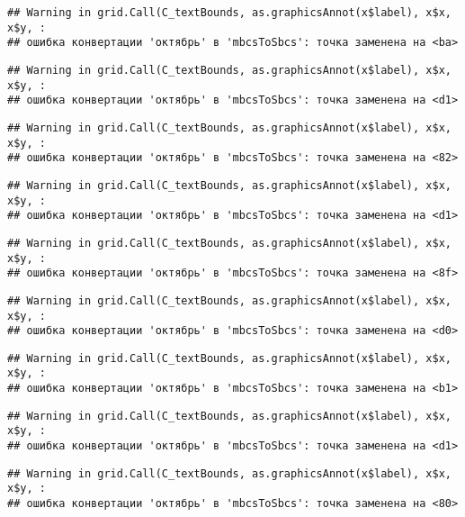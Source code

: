\documentclass[
]{article}
\begin{document}
\begin{verbatim}
## Warning in grid.Call(C_textBounds, as.graphicsAnnot(x$label), x$x, x$y, :
## ошибка конвертации 'октябрь' в 'mbcsToSbcs': точка заменена на <ba>
\end{verbatim}

\begin{verbatim}
## Warning in grid.Call(C_textBounds, as.graphicsAnnot(x$label), x$x, x$y, :
## ошибка конвертации 'октябрь' в 'mbcsToSbcs': точка заменена на <d1>
\end{verbatim}

\begin{verbatim}
## Warning in grid.Call(C_textBounds, as.graphicsAnnot(x$label), x$x, x$y, :
## ошибка конвертации 'октябрь' в 'mbcsToSbcs': точка заменена на <82>
\end{verbatim}

\begin{verbatim}
## Warning in grid.Call(C_textBounds, as.graphicsAnnot(x$label), x$x, x$y, :
## ошибка конвертации 'октябрь' в 'mbcsToSbcs': точка заменена на <d1>
\end{verbatim}

\begin{verbatim}
## Warning in grid.Call(C_textBounds, as.graphicsAnnot(x$label), x$x, x$y, :
## ошибка конвертации 'октябрь' в 'mbcsToSbcs': точка заменена на <8f>
\end{verbatim}

\begin{verbatim}
## Warning in grid.Call(C_textBounds, as.graphicsAnnot(x$label), x$x, x$y, :
## ошибка конвертации 'октябрь' в 'mbcsToSbcs': точка заменена на <d0>
\end{verbatim}

\begin{verbatim}
## Warning in grid.Call(C_textBounds, as.graphicsAnnot(x$label), x$x, x$y, :
## ошибка конвертации 'октябрь' в 'mbcsToSbcs': точка заменена на <b1>
\end{verbatim}

\begin{verbatim}
## Warning in grid.Call(C_textBounds, as.graphicsAnnot(x$label), x$x, x$y, :
## ошибка конвертации 'октябрь' в 'mbcsToSbcs': точка заменена на <d1>
\end{verbatim}

\begin{verbatim}
## Warning in grid.Call(C_textBounds, as.graphicsAnnot(x$label), x$x, x$y, :
## ошибка конвертации 'октябрь' в 'mbcsToSbcs': точка заменена на <80>
\end{verbatim}
\end{document}
